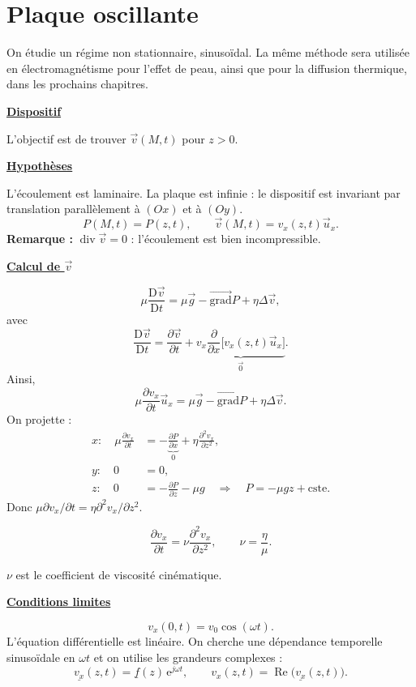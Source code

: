 \documentclass[11pt,a4paper]{article}
\newcommand{\grad}{\overrightarrow{\mathrm{grad}}}
\newcommand{\pd}[2]{\frac{\partial #1}{\partial #2}}
\newcommand{\ux}{\vec u_x}\newcommand{\uy}{\vec u_y}\newcommand{\uz}{\vec u_z}
\newcommand{\cste}{\mathrm{cste}}
\newcommand{\titr}[1]{\par\textbf{\underline{#1}}\par\nopagebreak[3]}
\newcommand{\Dv}{\frac{\mathrm D\vec v}{\mathrm Dt}}
\newcommand{\diver}{\operatorname{div}}
\newcommand{\cv}{\underline{v_x}}\newcommand{\cf}{\underline f}
\begin{document}
\section{Plaque oscillante}
On étudie un régime non stationnaire, sinusoïdal. La même méthode sera utilisée en électromagnétisme pour l'effet de peau, ainsi que pour la diffusion thermique, dans les prochains chapitres.
\Needspace{100pt}\titr{Dispositif}
\begin{center}\end{center}
L'objectif est de trouver $\vec v(M,t)$ pour $z>0$.
\titr{Hypothèses}
L'écoulement est laminaire. La plaque est infinie : le dispositif est invariant par translation parallèlement à $(Ox)$ et à $(Oy)$.
\[P(M,t)=P(z,t),\qquad\vec v(M,t)=v_x(z,t)\ux.\]
\textbf{Remarque :} $\diver\vec v=0$ : l'écoulement est bien incompressible.
\titr{Calcul de $\vec v$}
\[\mu\Dv=\mu\vec g-\grad P+\eta\Delta\vec v,\]
avec
\[\Dv=\pd{\vec v}{t}+\underbrace{v_x\frac\partial{\partial x}\bigl[v_x(z,t)\ux\bigr]}_{\vec0}.\]
Ainsi,
\[\mu\pd{v_x}{t}\ux=\mu\vec g-\grad P+\eta\Delta\vec v.\]
On projette :
\[\begin{aligned}
x:\quad\mu\pd{v_x}{t}&=-\underbrace{\pd P x}_{0}+\eta\frac{\partial^2v_x}{\partial z^2},\\[7pt]
y:\quad0&=0,\\[5pt]
z:\quad0&=-\pd P z-\mu g\quad\Longrightarrow\quad P=-\mu gz+\cste.
\end{aligned}\]
Donc $\mu\partial v_x/\partial t=\eta\partial^2v_x/\partial z^2$.
\begin{cadre}\[\pd{v_x}{t}=\nu\frac{\partial^2v_x}{\partial z^2},\qquad\nu=\frac\eta\mu.\]\end{cadre}
$\nu$ est le coefficient de viscosité cinématique.
\Needspace{65pt}\titr{Conditions limites}
\[v_x(0,t)=v_0\cos(\omega t).\]
L'équation différentielle est linéaire. On cherche une dépendance temporelle sinusoïdale en $\omega t$ et on utilise les grandeurs complexes :
\[\cv(z,t)=\cf(z)\,\mathrm e^{j\omega t},\qquad v_x(z,t)=\operatorname{Re}\bigl(\cv(z,t)\bigr).\]
\end{document}
